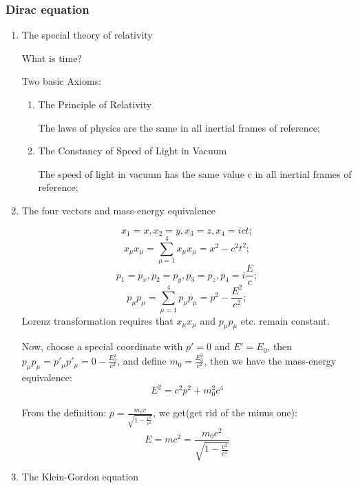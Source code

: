 \documentclass[12pt]{article}
\numberwithin{equation}{section}
\begin{document}
\subsubsection{Dirac equation}
\begin{enumerate}
\item The special theory of relativity\par
	What is time?\par
	Two basic Axioms:
	\begin{enumerate}
		\item The Principle of Relativity\par
		The laws of physics are the same in all inertial frames of reference;
		\item The Constancy of Speed of Light in Vacuum\par
		The speed of light in vacuum has the same value c in all inertial frames of reference;			\end{enumerate}
\item The four vectors and mass-energy equivalence \par
	\begin{equation}x_1=x, x_2=y, x_3=z, x_4=ict;\end{equation}
	\begin{equation}x_\mu x_\mu = \sum_{\mu=1}^{4} x_\mu x_\mu = x^2-c^2 t^2; \end{equation}
	\begin{equation}p_1=p_x, p_2=p_y, p_3=p_z, p_4=i\frac{E}{c};\end{equation}
	\begin{equation}p_\mu p_\mu = \sum_{\mu=1}^{4} p_\mu p_\mu = p^2-\frac{E^2}{c^2};\end{equation}
	Lorenz transformation requires that $x_\mu x_\mu$ and $p_\mu p_\mu$ etc. remain constant.\par
	Now, choose a special coordinate with $p'=0$ and $E'=E_0$, then 
	$p_\mu p_\mu=p'_\mu p'_\mu=0-\frac{E_0^2}{c^2}$, and define $m_0=\frac{E_0^2}{c^2}$, 
	then we have the mass-energy equivalence:
	\begin{equation}
		E^2=c^2p^2+m_0^2c^4
	\end{equation} \par
	From the definition: $p=\frac{m_0v}{\sqrt{1-\frac{v^2}{c^2}}}$, we get(get rid of the minus one):
	\begin{equation}
		E=mc^2=\frac{m_0c^2}{\sqrt{1-\frac{v^2}{c^2}}}
	\end{equation}
\item The Klein-Gordon equation \par

\end{enumerate}
\end{document}
